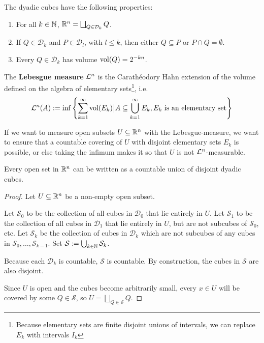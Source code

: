 \begin{rem}
The dyadic cubes have the following properties:
\begin{enumerate}
  \item For all $k \in \mathbb{N}$, $\mathbb{R}^{n} = \bigsqcup_{Q \in \mathcal{D}_k}Q$.
  \item If $Q \in \mathcal{D}_k$ and $P \in \mathcal{D}_l$, with $l \leq k$, then either $Q \subseteq P$ or $P \cap Q = \emptyset$.
  \item Every $Q \in \mathcal{D}_k$ has volume $\operatorname{vol}(Q) = 2^{-kn}$.
\end{enumerate}
\end{rem}


\begin{dfn}[]
  The \textbf{Lebesgue measure} $\mathcal{L}^{n}$ is the Carathéodory Hahn extension of the volume defined on the algebra of elementary sets\footnote{Because elementary sets are finite disjoint unions of intervals, we can replace $E_k$ with intervals $I_k$}, i.e.
\begin{align*}
  \mathcal{L}^{n}(A) := \inf \left\{
    \sum_{k=1}^{\infty} \operatorname{vol}(E_k) \big\vert A \subseteq \bigcup_{k=1}^{\infty} E_k, E_k \text{ is an elementary set}
  \right\}
\end{align*}
\end{dfn}

If we want to measure open subsets $U \subseteq \mathbb{R}^{n}$ with the Lebesgue-measure, we want to ensure that a countable covering of $U$ with disjoint elementary sets $E_k$ is possible, or else taking the infimum makes it so that $U$ is not $\mathcal{L}^{n}$-measurable.

\begin{lem}[] \label{lem:open-dyadic}
  Every open set in $\mathbb{R}^{n}$ can be written as a countable union of disjoint dyadic cubes.
\end{lem}
\begin{proof}
Let $U \subseteq \mathbb{R}^{n}$ be a non-empty open subset.

Let $\mathcal{S}_0$ to be the collection of all cubes in $\mathcal{D}_0$ that lie entirely in $U$.
Let $\mathcal{S}_1$ to be the collection of all cubes in $\mathcal{D}_1$ that lie entirely in $U$, but are not subcubes of $\mathcal{S}_0$, etc.
Let $\mathcal{S}_k$ be the collection of cubes in $\mathcal{D}_k$ which are not subcubes of any cubes in $\mathcal{S}_0, \ldots, \mathcal{S}_{k-1}$.
Set $\mathcal{S} := \bigcup_{k \in \mathbb{N}}\mathcal{S}_k$.

Because each $\mathcal{D}_k$ is countable, $\mathcal{S}$ is countable.
By construction, the cubes in $\mathcal{S}$ are also disjoint.

Since $U$ is open and the cubes become arbitrarily small, every $x \in U$ will be covered by some $Q \in \mathcal{S}$, so $U = \bigsqcup_{Q \in \mathcal{S}}Q$.

\end{proof}

